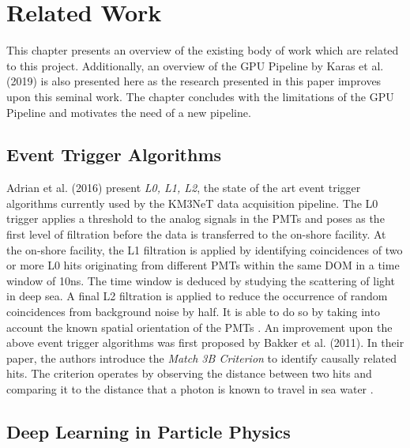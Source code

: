 \chapter{Related Work}
\label{cha:related-work}

This chapter presents an overview of the existing body of work which
are related to this project. Additionally, an overview of the GPU
Pipeline by Karas et al. (2019) is also presented here as the research
presented in this paper improves upon this seminal work. The chapter
concludes with the limitations of the GPU Pipeline and motivates the
need of a new pipeline.

\section{Event Trigger Algorithms}
\label{sec:trigger-algos}

Adrian et al. (2016) present \emph{L0, L1, L2}, the state of the art
event trigger algorithms currently used by the KM3NeT data acquisition
pipeline. The L0 trigger applies a threshold to the analog signals in
the PMTs and poses as the first level of filtration before the data is
transferred to the on-shore facility. At the on-shore facility, the L1
filtration is applied by identifying coincidences of two or more L0
hits originating from different PMTs within the same DOM in a time
window of 10ns. The time window is deduced by studying the scattering
of light in deep sea. A final L2 filtration is applied to reduce the
occurrence of random coincidences from background noise by half. It is
able to do so by taking into account the known spatial orientation of
the PMTs \cite{adrian2016letter}. An improvement upon the above event
trigger algorithms was first proposed by Bakker et al. (2011). In
their paper, the authors introduce the \emph{Match 3B Criterion} to
identify causally related hits. The criterion operates by observing
the distance between two hits and comparing it to the distance that a
photon is known to travel in sea water \cite{bakker2011trigger}.

\section{Deep Learning in Particle Physics}
\label{sec:dl-part-phy}

